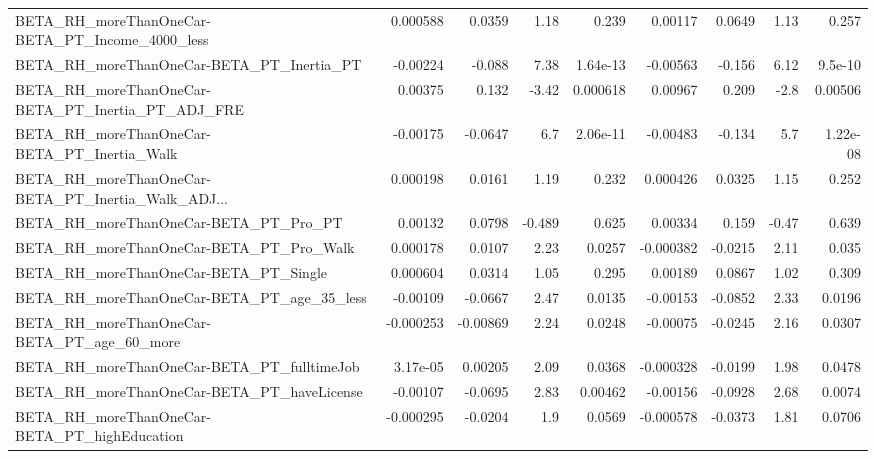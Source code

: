 \begin{tabular}{lrrrrrrrr}
BETA\_RH\_moreThanOneCar-BETA\_PT\_Income\_4000\_less    &    0.000588 &       0.0359 &     1.18 &    0.239 &    0.00117 &      0.0649 &         1.13 &         0.257 \\
BETA\_RH\_moreThanOneCar-BETA\_PT\_Inertia\_PT          &    -0.00224 &       -0.088 &     7.38 & 1.64e-13 &   -0.00563 &      -0.156 &         6.12 &       9.5e-10 \\
BETA\_RH\_moreThanOneCar-BETA\_PT\_Inertia\_PT\_ADJ\_FRE  &     0.00375 &        0.132 &    -3.42 & 0.000618 &    0.00967 &       0.209 &         -2.8 &       0.00506 \\
BETA\_RH\_moreThanOneCar-BETA\_PT\_Inertia\_Walk        &    -0.00175 &      -0.0647 &      6.7 & 2.06e-11 &   -0.00483 &      -0.134 &          5.7 &      1.22e-08 \\
BETA\_RH\_moreThanOneCar-BETA\_PT\_Inertia\_Walk\_ADJ... &    0.000198 &       0.0161 &     1.19 &    0.232 &   0.000426 &      0.0325 &         1.15 &         0.252 \\
BETA\_RH\_moreThanOneCar-BETA\_PT\_Pro\_PT              &     0.00132 &       0.0798 &   -0.489 &    0.625 &    0.00334 &       0.159 &        -0.47 &         0.639 \\
BETA\_RH\_moreThanOneCar-BETA\_PT\_Pro\_Walk            &    0.000178 &       0.0107 &     2.23 &   0.0257 &  -0.000382 &     -0.0215 &         2.11 &         0.035 \\
BETA\_RH\_moreThanOneCar-BETA\_PT\_Single              &    0.000604 &       0.0314 &     1.05 &    0.295 &    0.00189 &      0.0867 &         1.02 &         0.309 \\
BETA\_RH\_moreThanOneCar-BETA\_PT\_age\_35\_less         &    -0.00109 &      -0.0667 &     2.47 &   0.0135 &   -0.00153 &     -0.0852 &         2.33 &        0.0196 \\
BETA\_RH\_moreThanOneCar-BETA\_PT\_age\_60\_more         &   -0.000253 &     -0.00869 &     2.24 &   0.0248 &   -0.00075 &     -0.0245 &         2.16 &        0.0307 \\
BETA\_RH\_moreThanOneCar-BETA\_PT\_fulltimeJob         &    3.17e-05 &      0.00205 &     2.09 &   0.0368 &  -0.000328 &     -0.0199 &         1.98 &        0.0478 \\
BETA\_RH\_moreThanOneCar-BETA\_PT\_haveLicense         &    -0.00107 &      -0.0695 &     2.83 &  0.00462 &   -0.00156 &     -0.0928 &         2.68 &        0.0074 \\
BETA\_RH\_moreThanOneCar-BETA\_PT\_highEducation       &   -0.000295 &      -0.0204 &      1.9 &   0.0569 &  -0.000578 &     -0.0373 &         1.81 &        0.0706 \\

\end{tabular}
